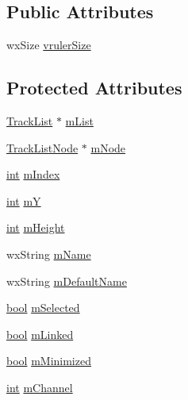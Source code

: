 \subsection*{Public Attributes}
\begin{DoxyCompactItemize}
\item 
wx\+Size \hyperlink{class_track_a798c2a7bb95cde4d9873f09aa08645bd}{vruler\+Size}
\end{DoxyCompactItemize}
\subsection*{Protected Attributes}
\begin{DoxyCompactItemize}
\item 
\hyperlink{class_track_list}{Track\+List} $\ast$ \hyperlink{class_track_aee09798f96d0ead19b1061b858548dc5}{m\+List}
\item 
\hyperlink{struct_track_list_node}{Track\+List\+Node} $\ast$ \hyperlink{class_track_a405067641c56a9f23eef63ad646db8f9}{m\+Node}
\item 
\hyperlink{xmltok_8h_a5a0d4a5641ce434f1d23533f2b2e6653}{int} \hyperlink{class_track_ada3ccc3db7f1c8f6249260335b12d1b4}{m\+Index}
\item 
\hyperlink{xmltok_8h_a5a0d4a5641ce434f1d23533f2b2e6653}{int} \hyperlink{class_track_a2735771116264155d95db58912964a52}{mY}
\item 
\hyperlink{xmltok_8h_a5a0d4a5641ce434f1d23533f2b2e6653}{int} \hyperlink{class_track_ac696598792865dc8f0d6e555ec6e1ee1}{m\+Height}
\item 
wx\+String \hyperlink{class_track_a885c04ed00a08ddaa6a3b2d72c55b384}{m\+Name}
\item 
wx\+String \hyperlink{class_track_a711d329605d3dbda2a57d68294dc7470}{m\+Default\+Name}
\item 
\hyperlink{mac_2config_2i386_2lib-src_2libsoxr_2soxr-config_8h_abb452686968e48b67397da5f97445f5b}{bool} \hyperlink{class_track_a673c205a3e39989f31d2e2e9d6addb5a}{m\+Selected}
\item 
\hyperlink{mac_2config_2i386_2lib-src_2libsoxr_2soxr-config_8h_abb452686968e48b67397da5f97445f5b}{bool} \hyperlink{class_track_aaaa8f25fed1beb509a3ada2ca81608b0}{m\+Linked}
\item 
\hyperlink{mac_2config_2i386_2lib-src_2libsoxr_2soxr-config_8h_abb452686968e48b67397da5f97445f5b}{bool} \hyperlink{class_track_ab767c29441016ba672a1f105389190ff}{m\+Minimized}
\item 
\hyperlink{xmltok_8h_a5a0d4a5641ce434f1d23533f2b2e6653}{int} \hyperlink{class_track_a95b5b00485210991a838286a6c0c3e96}{m\+Channel}

\end{DoxyCompactItemize}
